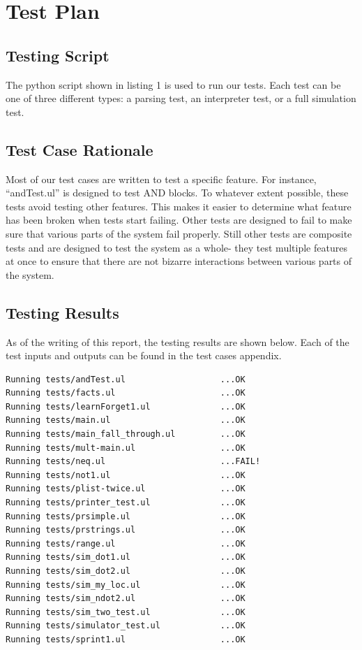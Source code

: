 \documentclass[onecolumn,titlepage]{article}
\begin{document}
\section{Test Plan}

\subsection{Testing Script}
The python script shown in listing 1 is used to run our
tests.  Each test can be one of three different types: a parsing test,
an interpreter test, or a full simulation test.

\lstset{caption=Testing Script,label=testpy}


\subsection{Test Case Rationale}
Most of our test cases are written to test a specific feature.  For
instance, ``andTest.ul'' is designed to test AND blocks.  To whatever
extent possible, these tests avoid testing other features.  This makes
it easier to determine what feature has been broken when tests start
failing.  Other tests are designed to fail to make sure that various
parts of the system fail properly.  Still other tests are composite
tests and are designed to test the system as a whole- they test
multiple features at once to ensure that there are not bizarre
interactions between various parts of the system.

\subsection{Testing Results}
As of the writing of this report, the testing results are shown
below.  Each of the test inputs and outputs can be found in the test
cases appendix.

\begin{verbatim}
Running tests/andTest.ul                   ...OK
Running tests/facts.ul                     ...OK
Running tests/learnForget1.ul              ...OK
Running tests/main.ul                      ...OK
Running tests/main_fall_through.ul         ...OK
Running tests/mult-main.ul                 ...OK
Running tests/neq.ul                       ...FAIL!
Running tests/not1.ul                      ...OK
Running tests/plist-twice.ul               ...OK
Running tests/printer_test.ul              ...OK
Running tests/prsimple.ul                  ...OK
Running tests/prstrings.ul                 ...OK
Running tests/range.ul                     ...OK
Running tests/sim_dot1.ul                  ...OK
Running tests/sim_dot2.ul                  ...OK
Running tests/sim_my_loc.ul                ...OK
Running tests/sim_ndot2.ul                 ...OK
Running tests/sim_two_test.ul              ...OK
Running tests/simulator_test.ul            ...OK
Running tests/sprint1.ul                   ...OK
\end{verbatim}
\end{document}
